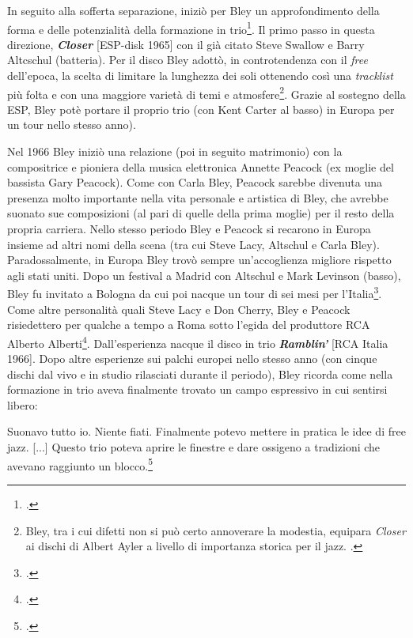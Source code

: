In seguito alla sofferta separazione, iniziò per Bley un approfondimento della forma e delle potenzialità della formazione in trio\footcite[98]{stopping}. Il primo passo in questa direzione, \textit{\textbf{Closer}} [ESP-disk 1965] con il già citato Steve Swallow e Barry Altcschul (batteria). Per il disco Bley adottò, in controtendenza con il \textit{free} dell'epoca, la scelta di limitare la lunghezza dei soli ottenendo così una \textit{tracklist} più folta e con una maggiore varietà di temi e atmosfere\footnote{Bley, tra i cui difetti non si può certo annoverare la modestia, equipara \textit{Closer} ai dischi di Albert Ayler a livello di importanza storica per il jazz. \cite[100]{stopping}.}. Grazie al sostegno della ESP, Bley potè portare il proprio trio (con Kent Carter al basso) in Europa per un tour nello stesso anno).\par
Nel 1966 Bley iniziò una relazione (poi in seguito matrimonio) con la compositrice e pioniera della musica elettronica Annette Peacock (ex moglie del bassista Gary Peacock). Come con Carla Bley, Peacock sarebbe divenuta una presenza molto importante nella vita personale e artistica di Bley, che avrebbe suonato sue composizioni (al pari di quelle della prima moglie) per il resto della propria carriera. Nello stesso periodo Bley e Peacock si recarono in Europa insieme ad altri nomi della scena (tra cui Steve Lacy, Altschul e Carla Bley).\\
Paradossalmente, in Europa Bley trovò sempre un'accoglienza migliore rispetto agli stati uniti. Dopo un festival a Madrid con Altschul e Mark Levinson (basso), Bley fu invitato a Bologna da cui poi nacque un tour di sei mesi per l'Italia\footcite[102]{stopping}. Come altre personalità quali Steve Lacy e Don Cherry, Bley e Peacock risiedettero per qualche a tempo a Roma sotto l'egida del produttore RCA Alberto Alberti\footcite[104]{stopping}. Dall'esperienza nacque il disco in trio \textit{\textbf{Ramblin'}} [RCA Italia 1966]. Dopo altre esperienze sui palchi europei nello stesso anno (con cinque dischi dal vivo e in studio rilasciati durante il periodo), Bley ricorda come nella formazione in trio aveva finalmente trovato un campo espressivo in cui sentirsi libero:
\begin{fquote}
	Suonavo tutto io. Niente fiati. Finalmente potevo mettere in pratica le  idee di free jazz. [...] Questo trio poteva aprire le finestre e dare ossigeno a tradizioni che avevano raggiunto un blocco.\footcite[106]{stopping}
\end{fquote}
